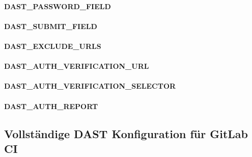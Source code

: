 \paragraph{DAST\_PASSWORD\_FIELD}
\paragraph{DAST\_SUBMIT\_FIELD}
\paragraph{DAST\_EXCLUDE\_URLS}
\paragraph{DAST\_AUTH\_VERIFICATION\_URL}
\paragraph{DAST\_AUTH\_VERIFICATION\_SELECTOR}
\paragraph{DAST\_AUTH\_REPORT}

\subsection{Vollständige DAST Konfiguration für GitLab CI}

